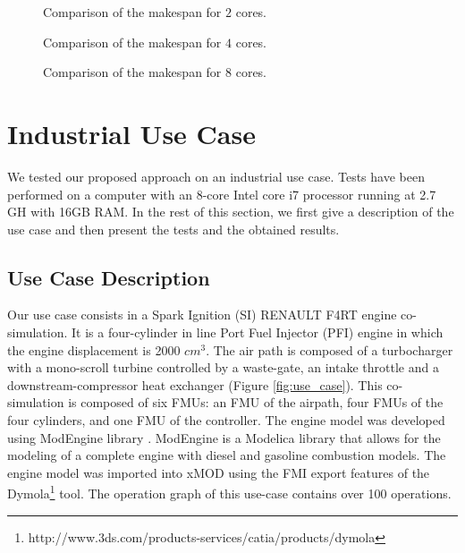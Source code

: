 \begin{figure}[phbt]
\centering

\caption{Comparison of the makespan for $2$ cores.}
\label{fig:sched_mkspan_2}
\end{figure}

\begin{figure}[phbt]
\centering

\caption{Comparison of the makespan for $4$ cores.}
\label{fig:sched_mkspan_4}
\end{figure}

\begin{figure}[phbt]
\centering

\caption{Comparison of the makespan for $8$ cores.}
\label{fig:sched_mkspan_8}
\end{figure} 

%

\section{Industrial Use Case} 

We tested our proposed approach on an industrial use case. Tests have been performed on a computer with an 8-core Intel core i7 processor running at 2.7 GH with 16GB RAM. In the rest of this section, we first give a description of the use case and then present the tests and the obtained results.

\subsection{Use Case Description}

Our use case consists in a Spark Ignition (SI) RENAULT F4RT engine co-simulation. It is a four-cylinder in line Port Fuel Injector (PFI) engine in which the engine displacement is 2000 $cm^3$. The air path is composed of a turbocharger with a mono-scroll turbine controlled by a waste-gate, an intake throttle and a downstream-compressor heat exchanger (Figure \ref{fig:use_case}). This co-simulation is composed of six FMUs: an FMU of the airpath, four FMUs of the four cylinders, and one FMU of the controller.
The engine model was developed using ModEngine library \cite{benjelloun:2011}. ModEngine is a Modelica library that allows for the modeling of a complete engine with diesel and gasoline combustion models. The engine model was imported into xMOD using the FMI export features of the Dymola\footnote{http://www.3ds.com/products-services/catia/products/dymola} tool. The operation graph of this use-case contains over 100 operations.

